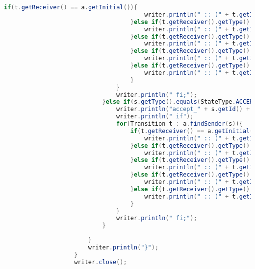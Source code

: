 \begin{lstlisting}[language=java, caption={példa unit teszteset.},captionpos=b]
									if(t.getReceiver() == a.getInitial()){
										writer.println(" :: (" + t.getId() + ")" + "->" + " goto T0_init");
									}else if(t.getReceiver().getType().equals(StateType.NORMAL)){
										writer.println(" :: (" + t.getId() + ") " + "->" + " goto T0_" + t.getReceiver().getId());
									}else if(t.getReceiver().getType().equals(StateType.ACCEPT_ALL)){
										writer.println(" :: (" + t.getId() + ") " + "->" + " goto accept_all" );
									}else if(t.getReceiver().getType().equals(StateType.FINAL)){
										writer.println(" :: (" + t.getId() + ") " + "->" + " goto T0_" + t.getReceiver().getId());
									}else if(t.getReceiver().getType().equals(StateType.ACCEPT)){
										writer.println(" :: (" + t.getId() + ") " + "->" + " goto accept_" + t.getReceiver().getId());
									}
								}
								writer.println(" fi;");
							}else if(s.getType().equals(StateType.ACCEPT)){
								writer.println("accept_" + s.getId() + ":");
								writer.println(" if");
								for(Transition t : a.findSender(s)){
									if(t.getReceiver() == a.getInitial()){
										writer.println(" :: (" + t.getId() + ")" + "->" + " goto T0_init");
									}else if(t.getReceiver().getType().equals(StateType.NORMAL)){
										writer.println(" :: (" + t.getId() + ") " + "->" + " goto T0_" + t.getReceiver().getId());
									}else if(t.getReceiver().getType().equals(StateType.ACCEPT_ALL)){
										writer.println(" :: (" + t.getId() + ") " + "->" + " goto accept_all" );
									}else if(t.getReceiver().getType().equals(StateType.FINAL)){
										writer.println(" :: (" + t.getId() + ") " + "->" + " goto T0_" + t.getReceiver().getId());
									}else if(t.getReceiver().getType().equals(StateType.ACCEPT)){
										writer.println(" :: (" + t.getId() + ") " + "->" + " goto accept_" + t.getReceiver().getId());
									}
								}
								writer.println(" fi;");
							}
							
						}
						writer.println("}");
					}
					writer.close();
					

\end{lstlisting}
